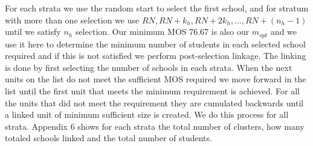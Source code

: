\documentclass[
  12pt]{article}
\begin{document}
For each strata we use the random start to select the first school, and
for stratum with more than one selection we use
\(RN, RN+k_h, RN+2k_h,...,RN +(n_h-1)\) until we satisfy \(n_h\)
selection. Our minimum MOS 76.67 is also our \(m_{opt}\) and we use it
here to determine the minimum number of students in each selected school
required and if this is not satisfied we perform post-selection linkage.
The linking is done by first selecting the number of schools in each
strata. When the next units on the list do not meet the sufficient MOS
required we move forward in the list until the first unit that meets the
minimum requirement is achieved. For all the units that did not meet the
requirement they are cumulated backwards until a linked unit of minimum
sufficient size is created. We do this process for all strata. Appendix
6 shows for each strata the total number of clusters, how many totaled
schools linked and the total number of students.
\end{document}
